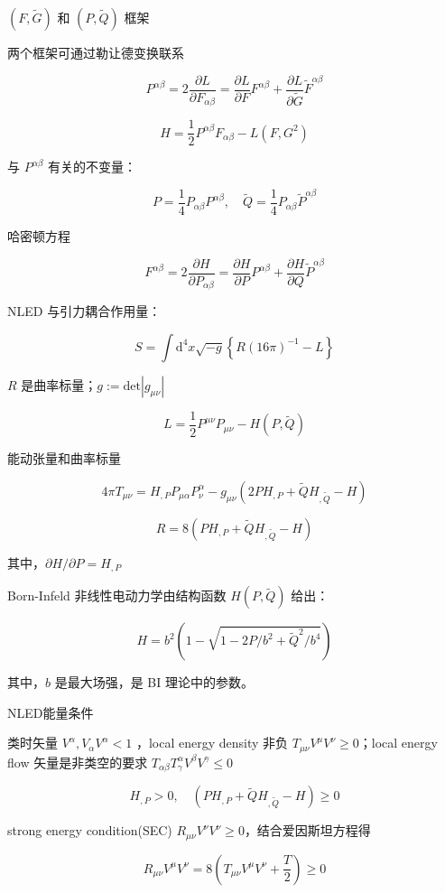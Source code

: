 \documentclass[9pt, dvipsnames]{beamer} %
\begin{document}
\begin{frame}{$(F,\tilde{G})$ 和 $(P,\tilde{Q})$ 框架}

    两个框架可通过勒让德变换联系

    $$
    P^{\alpha\beta}
    =2\frac{\partial L }{\partial F_{\alpha\beta} } 
    =\frac{\partial L }{\partial F } F^{\alpha\beta} + \frac{\partial L }{\partial \tilde{G} } \tilde{F}^{\alpha\beta}
    $$

$$
H
=\frac{1 }{2 } P^{\alpha\beta} F_{\alpha\beta} - L\left(F,G^2 \right)
$$

与 $P^{\alpha\beta} $ 有关的不变量：

$$
P = \frac{1 }{4 } P_{\alpha\beta} P^{\alpha\beta},\quad
\tilde{Q} = \frac{1 }{4 } P_{\alpha\beta}\tilde{P}^{\alpha\beta}
$$

哈密顿方程

$$
F^{\alpha\beta}
=2\frac{\partial H }{\partial P_{\alpha\beta} } 
=\frac{\partial H }{\partial P } P^{\alpha\beta} + \frac{\partial H }{\partial Q } \tilde{P}^{\alpha\beta}
$$
    
\end{frame}

\begin{frame}
    NLED 与引力耦合作用量：

    $$
    S
    =\int \mathrm{d}^4 x\sqrt{-g} \left\{R(16\pi)^{-1}-L \right\}
    $$
    
    $R $ 是曲率标量；$g:=\mathrm{det}\left|g_{\mu\nu} \right| $
    
    $$
    L
    =\frac{1 }{2 } P^{\mu\nu}P_{\mu\nu} - H\left(P,\tilde{Q} \right)
    $$

    能动张量和曲率标量

$$
4\pi T_{\mu\nu}
=H_{,P} P_{\mu\alpha} P_\nu^\alpha - g_{\mu\nu}\left(2P H_{,P} + \tilde{Q} H_{,\tilde{Q}} - H \right)
$$

$$
R
=8\left(P H_{,P} + \tilde{Q} H_{,\tilde{Q}} - H \right) 
$$

其中，$\partial H/\partial P = H_{,P} $ 

Born-Infeld 非线性电动力学由结构函数 $H(P,\tilde{Q}) $ 给出：

$$
H = b^2\left(1-\sqrt{1-2P/b^2+\tilde{Q}^2/b^4} \right) 
$$

其中，$b $ 是最大场强，是 BI 理论中的参数。
\end{frame}

\begin{frame}{NLED能量条件}

    类时矢量 $V^\alpha,V_\alpha V^\alpha<1 $ ，local energy density 非负 $T_{\mu\nu}V^\mu V^\nu\geqslant 0 $；local energy flow 矢量是非类空的要求 $T_{\alpha\beta}T_\gamma^\alpha V^\beta V^\gamma\leqslant 0 $

    $$
    H_{,P}>0,\quad
    \left(P H_{,P} + \tilde{Q} H_{,\tilde{Q}} - H \right) \geqslant 0
    $$
    
    strong energy condition(SEC) $R_{\mu\nu}V^\nu V^\nu\geqslant 0 $，结合爱因斯坦方程得
    
    $$
    R_{\mu\nu}V^\mu V^\nu 
    =8\left(T_{\mu\nu} V^\mu V^\nu + \frac{T }{2 }  \right) \geqslant 0
    $$
    
\end{frame}
\end{document}
